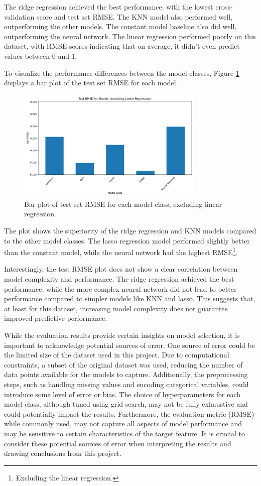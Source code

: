 \documentclass{article}
\begin{document}
The ridge regression achieved the best performance, with the lowest cross-validation score and test set RMSE. The KNN model also performed well, outperforming the other models. The constant model baseline also did well, outperforming the neural network. The linear regression performed poorly on this dataset, with RMSE scores indicating that on average, it didn't even predict values between 0 and 1.

To visualize the performance differences between the model classes, Figure \ref{fig:test_rmse} displays a bar plot of the test set RMSE for each model.

\begin{figure}[ht]
\centering
\includegraphics[width=0.8\textwidth]{test_rmse_plot_no_linear.png}
\caption{Bar plot of test set RMSE for each model class, excluding linear regression.}
\label{fig:test_rmse}
\end{figure}

The plot shows the superiority of the ridge regression and KNN models compared to the other model classes. The lasso regression model performed slightly better than the constant model, while the neural network had the highest RMSE\footnote{Excluding the linear regression.}.

Interestingly, the test RMSE plot does not show a clear correlation between model complexity and performance. The ridge regression achieved the best performance, while the more complex neural network did not lead to better performance compared to simpler models like KNN and lasso. This suggests that, at least for this dataset, increasing model complexity does not guarantee improved predictive performance.

While the evaluation results provide certain insights on model selection, it is important to acknowledge potential sources of error. One source of error could be the limited size of the dataset used in this project. Due to computational constraints, a subset of the original dataset was used, reducing the number of data points available for the models to capture. Additionally, the preprocessing steps, such as handling missing values and encoding categorical variables, could introduce some level of error or bias. The choice of hyperparameters for each model class, although tuned using grid search, may not be fully exhaustive and could potentially impact the results. Furthermore, the evaluation metric (RMSE) while commonly used, may not capture all aspects of model performance and may be sensitive to certain characteristics of the target feature. It is crucial to consider these potential sources of error when interpreting the results and drawing conclusions from this project.
\end{document}
